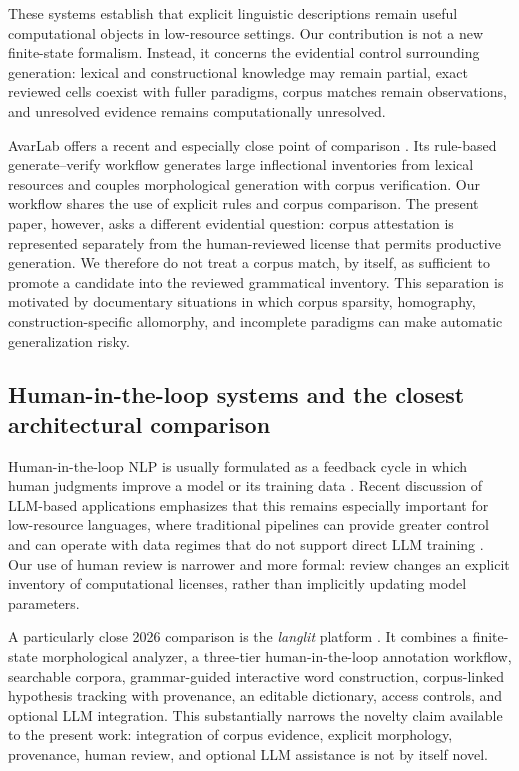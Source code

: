 \documentclass[11pt]{article}
\begin{document}
These systems establish that explicit linguistic descriptions remain useful
computational objects in low-resource settings. Our contribution is not a new
finite-state formalism. Instead, it concerns the evidential control surrounding
generation: lexical and constructional knowledge may remain partial, exact
reviewed cells coexist with fuller paradigms, corpus matches remain
observations, and unresolved evidence remains computationally unresolved.

AvarLab offers a recent and especially close point of comparison
\cite{zagidov2026avarlab}. Its rule-based generate--verify workflow generates
large inflectional inventories from lexical resources and couples morphological
generation with corpus verification. Our workflow shares the use of explicit
rules and corpus comparison. The present paper, however, asks a different
evidential question: corpus attestation is represented separately from the
human-reviewed license that permits productive generation. We therefore do not
treat a corpus match, by itself, as sufficient to promote a candidate into the
reviewed grammatical inventory. This separation is motivated by documentary
situations in which corpus sparsity, homography, construction-specific
allomorphy, and incomplete paradigms can make automatic generalization risky.

\subsection{Human-in-the-loop systems and the closest architectural comparison}

Human-in-the-loop NLP is usually formulated as a feedback cycle in which human
judgments improve a model or its training data \cite{wang2021hitl}. Recent
discussion of LLM-based applications emphasizes that this remains especially
important for low-resource languages, where traditional pipelines can provide
greater control and can operate with data regimes that do not support direct
LLM training \cite{eckert2026humans}. Our use of human review is narrower and
more formal: review changes an explicit inventory of computational licenses,
rather than implicitly updating model parameters.

A particularly close 2026 comparison is the \emph{langlit} platform
\cite{haberland2026langlit}. It combines a finite-state morphological analyzer,
a three-tier human-in-the-loop annotation workflow, searchable corpora,
grammar-guided interactive word construction, corpus-linked hypothesis
tracking with provenance, an editable dictionary, access controls, and optional
LLM integration. This substantially narrows the novelty claim available to the
present work: integration of corpus evidence, explicit morphology, provenance,
human review, and optional LLM assistance is not by itself novel.
\end{document}
